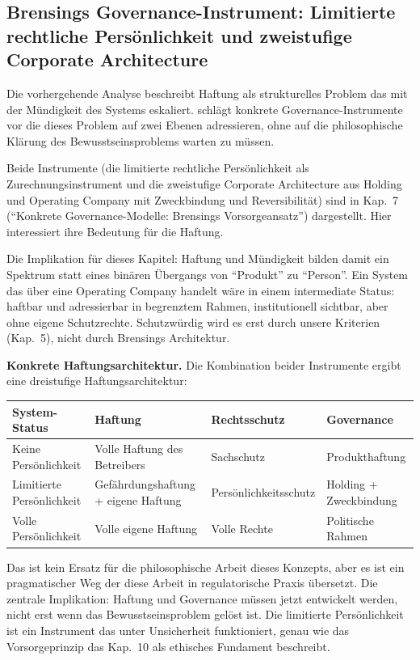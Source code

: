 \documentclass[acmlarge, noacm]{acmart}
\begin{document}
\subsection{Brensings Governance-Instrument: Limitierte rechtliche Persönlichkeit und zweistufige Corporate Architecture}

Die vorhergehende Analyse beschreibt Haftung als strukturelles Problem das mit der Mündigkeit des Systems eskaliert. \citet{brensing2026} schlägt konkrete Governance-Instrumente vor die dieses Problem auf zwei Ebenen adressieren, ohne auf die philosophische Klärung des Bewusstseinsproblems warten zu müssen.

Beide Instrumente (die limitierte rechtliche Persönlichkeit als Zurechnungsinstrument und die zweistufige Corporate Architecture aus Holding und Operating Company mit Zweckbindung und Reversibilität) sind in Kap.~7 (``Konkrete Governance-Modelle: Brensings Vorsorgeansatz'') dargestellt. Hier interessiert ihre Bedeutung für die Haftung.

Die Implikation für dieses Kapitel: Haftung und Mündigkeit bilden damit ein Spektrum statt eines binären Übergangs von ``Produkt'' zu ``Person''. Ein System das über eine Operating Company handelt wäre in einem intermediate Status: haftbar und adressierbar in begrenztem Rahmen, institutionell sichtbar, aber ohne eigene Schutzrechte. Schutzwürdig wird es erst durch unsere Kriterien (Kap.~5), nicht durch Brensings Architektur.

\textbf{Konkrete Haftungsarchitektur.} Die Kombination beider Instrumente ergibt eine dreistufige Haftungsarchitektur:

\begin{center}
\begin{tabular}{@{}llll@{}}
\toprule
System-Status & Haftung & Rechtsschutz & Governance \\
\midrule
Keine Persönlichkeit & Volle Haftung des Betreibers & Sachschutz & Produkthaftung \\
Limitierte Persönlichkeit & Gefährdungshaftung + eigene Haftung & Persönlichkeitsschutz & Holding + Zweckbindung \\
Volle Persönlichkeit & Volle eigene Haftung & Volle Rechte & Politische Rahmen \\
\bottomrule
\end{tabular}
\end{center}

Das ist kein Ersatz für die philosophische Arbeit dieses Konzepts, aber es ist ein pragmatischer Weg der diese Arbeit in regulatorische Praxis übersetzt. Die zentrale Implikation: Haftung und Governance müssen jetzt entwickelt werden, nicht erst wenn das Bewusstseinsproblem gelöst ist. Die limitierte Persönlichkeit ist ein Instrument das unter Unsicherheit funktioniert, genau wie das Vorsorgeprinzip das Kap.~10 als ethisches Fundament beschreibt.
\end{document}
